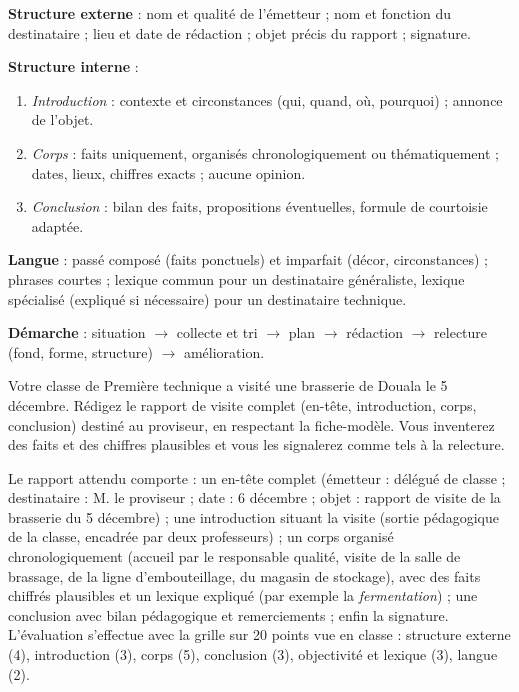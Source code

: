 \documentclass[11pt]{article}
\begin{document}
\begin{aretenir}
\textbf{Structure externe} : nom et qualité de l'émetteur ; nom et fonction du destinataire ; lieu et date de rédaction ; objet précis du rapport ; signature.

\textbf{Structure interne} :
\begin{enumerate}
\item \emph{Introduction} : contexte et circonstances (qui, quand, où, pourquoi) ; annonce de l'objet.
\item \emph{Corps} : faits uniquement, organisés chronologiquement ou thématiquement ; dates, lieux, chiffres exacts ; aucune opinion.
\item \emph{Conclusion} : bilan des faits, propositions éventuelles, formule de courtoisie adaptée.
\end{enumerate}

\textbf{Langue} : passé composé (faits ponctuels) et imparfait (décor, circonstances) ; phrases courtes ; lexique commun pour un destinataire généraliste, lexique spécialisé (expliqué si nécessaire) pour un destinataire technique.

\textbf{Démarche} : situation $\rightarrow$ collecte et tri $\rightarrow$ plan $\rightarrow$ rédaction $\rightarrow$ relecture (fond, forme, structure) $\rightarrow$ amélioration.
\end{aretenir}

\begin{exercice}
Votre classe de Première technique a visité une brasserie de Douala le 5 décembre. Rédigez le rapport de visite complet (en-tête, introduction, corps, conclusion) destiné au proviseur, en respectant la fiche-modèle. Vous inventerez des faits et des chiffres plausibles et vous les signalerez comme tels à la relecture.
\end{exercice}

\begin{corrige}
Le rapport attendu comporte : un en-tête complet (émetteur : délégué de classe ; destinataire : M. le proviseur ; date : 6 décembre ; objet : rapport de visite de la brasserie du 5 décembre) ; une introduction situant la visite (sortie pédagogique de la classe, encadrée par deux professeurs) ; un corps organisé chronologiquement (accueil par le responsable qualité, visite de la salle de brassage, de la ligne d'embouteillage, du magasin de stockage), avec des faits chiffrés plausibles et un lexique expliqué (par exemple la \emph{fermentation}) ; une conclusion avec bilan pédagogique et remerciements ; enfin la signature. L'évaluation s'effectue avec la grille sur 20 points vue en classe : structure externe (4), introduction (3), corps (5), conclusion (3), objectivité et lexique (3), langue (2).
\end{corrige}
\end{document}
